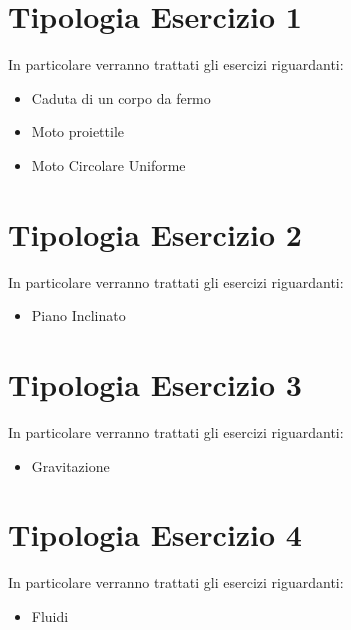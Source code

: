 




\newpage

\tableofcontents

\newpage
\section{Tipologia Esercizio 1}
In particolare verranno trattati gli esercizi riguardanti:
\begin{itemize}
\item Caduta di un corpo da fermo
\item Moto proiettile
\item Moto Circolare Uniforme
\end{itemize}





\clearpage
\newpage
\section{Tipologia Esercizio 2}
In particolare verranno trattati gli esercizi riguardanti:
\begin{itemize}
\item Piano Inclinato 
\end{itemize}




\clearpage
\section{Tipologia Esercizio 3}
In particolare verranno trattati gli esercizi riguardanti:
\begin{itemize}
\item Gravitazione
\end{itemize}




\clearpage

\section{Tipologia Esercizio 4}
In particolare verranno trattati gli esercizi riguardanti:
\begin{itemize}
\item Fluidi
\end{itemize}




\clearpage
